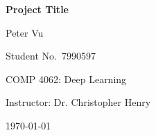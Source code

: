 \documentclass[12pt,letterpaper]{article}
\newcommand{\projecttitle}{Project Title}
\newcommand{\studentname}{Peter Vu}
\newcommand{\studentnumber}{7990597}
\newcommand{\coursename}{COMP 4062: Deep Learning}
\newcommand{\instructorname}{Dr. Christopher Henry}
\newcommand{\reportdate}{\today}
\begin{document}
\begin{titlepage}
  \centering
  \vspace*{2in}
  {\LARGE\bfseries \projecttitle\par}
  \vspace{1in}
  {\large \studentname\par}
  {\large Student No.\ \studentnumber\par}
  \vspace{0.5in}
  {\large \coursename\par}
  {\large Instructor: \instructorname\par}
  \vspace{0.5in}
  {\large \reportdate\par}
\end{titlepage}












\end{document}
